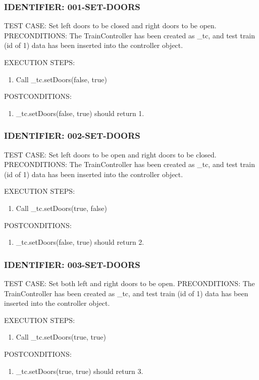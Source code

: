 \documentclass{scrreprt}
\begin{document}
\subsubsection{IDENTIFIER: 001-SET-DOORS}
TEST CASE: Set left doors to be closed and right doors to be open.
PRECONDITIONS: The TrainController has been created as _tc, and test train (id of 1) data has been inserted into the controller object.

EXECUTION STEPS:
\begin{enumerate}
	\item Call _tc.setDoors(false, true)
\end{enumerate}
POSTCONDITIONS:
\begin{enumerate}
	\item _tc.setDoors(false, true) should return 1.
\end{enumerate}

\subsubsection{IDENTIFIER: 002-SET-DOORS}
TEST CASE: Set left doors to be open and right doors to be closed.
PRECONDITIONS: The TrainController has been created as _tc, and test train (id of 1) data has been inserted into the controller object.

EXECUTION STEPS:
\begin{enumerate}
	\item Call _tc.setDoors(true, false)
\end{enumerate}
POSTCONDITIONS:
\begin{enumerate}
	\item _tc.setDoors(false, true) should return 2.
\end{enumerate}

\subsubsection{IDENTIFIER: 003-SET-DOORS}
TEST CASE: Set both left and right doors to be open.
PRECONDITIONS: The TrainController has been created as _tc, and test train (id of 1) data has been inserted into the controller object.

EXECUTION STEPS:
\begin{enumerate}
	\item Call _tc.setDoors(true, true)
\end{enumerate}
POSTCONDITIONS:
\begin{enumerate}
	\item _tc.setDoors(true, true) should return 3.
\end{enumerate}
\end{document}
